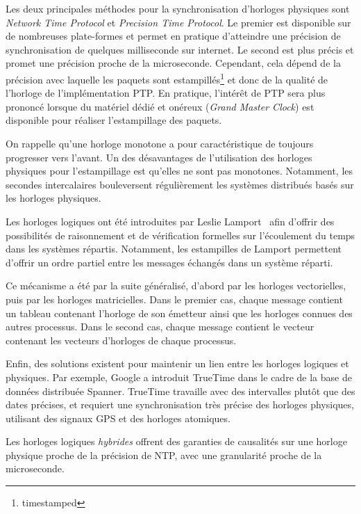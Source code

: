 \documentclass{article}
\begin{document}
Les deux principales méthodes pour la synchronisation d'horloges physiques sont \emph{Network Time Protocol}\cite{mills1991internet} et \emph{Precision Time Protocol}\cite{peng2009research}. 
Le premier est disponible sur de nombreuses plate-formes et permet en pratique d'atteindre une précision de synchronisation de quelques milliseconde sur internet. 
Le second est plus précis et promet une précision proche de la microseconde. 
Cependant, cela dépend de la précision avec laquelle les paquets sont estampillés\footnote{timestamped} et donc de la qualité de l'horloge de l'implémentation PTP. 
En pratique, l'intérêt de PTP sera plus prononcé lorsque du matériel dédié et onéreux (\emph{Grand Master Clock}) est disponible pour réaliser l'estampillage des paquets.

On rappelle qu'une horloge monotone a pour caractéristique de toujours progresser vers l'avant. 
Un des désavantages de l'utilisation des horloges physiques pour l'estampillage est qu'elles ne sont pas monotones. 
Notamment, les secondes intercalaires bouleversent régulièrement les systèmes distribués basés sur les horloges physiques.


Les horloges logiques ont été introduites par Leslie Lamport~\cite{lamport1978time} afin d'offrir des possibilités de raisonnement et de vérification formelles sur l'écoulement du temps dans les systèmes répartis.
Notamment, les estampilles de Lamport permettent d'offrir un ordre partiel entre les messages échangés dans un système réparti.

Ce mécanisme a été par la suite généralisé, d'abord par les horloges vectorielles, puis par les horloges matricielles. 
Dans le premier cas, chaque message contient un tableau contenant l'horloge de son émetteur ainsi que les horloges connues des autres processus. Dans le second cas, chaque message contient le vecteur contenant les vecteurs d'horloges de chaque processus.

Enfin, des solutions existent pour maintenir un lien entre les horloges logiques et physiques. 
Par exemple, Google a introduit TrueTime dans le cadre de la base de données distribuée Spanner\cite{corbett2013spanner}. 
TrueTime travaille avec des intervalles plutôt que des dates précises, et requiert une synchronisation très précise des horloges physiques, utilisant des signaux GPS et des horloges atomiques.

Les horloges logiques \textit{hybrides}\cite{kulkarni2014logical} offrent des garanties de causalités sur une horloge physique proche de la précision de NTP, avec une granularité proche de la microseconde.
\end{document}
